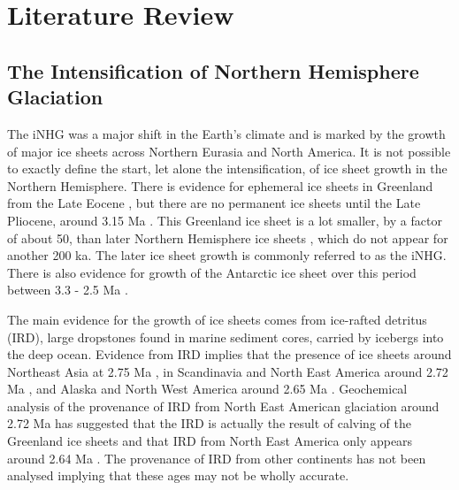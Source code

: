 \section{Literature Review}

\subsection{The Intensification of Northern Hemisphere Glaciation}

The iNHG was a major shift in the Earth’s climate and is marked by the growth of major ice sheets across Northern Eurasia and North America. It is not possible to exactly define the start, let alone the intensification, of ice sheet growth in the Northern Hemisphere. There is evidence for ephemeral ice sheets in Greenland from the Late Eocene \citep{eldrettContinentalIceGreenland2007}, but there are no permanent ice sheets until the Late Pliocene, around 3.15 Ma \citep{bartoliFinalClosurePanama2005}. This Greenland ice sheet is a lot smaller, by a factor of about 50, than later Northern Hemisphere ice sheets \citep{batchelorConfigurationNorthernHemisphere2019}, which do not appear for another 200 ka. The later ice sheet growth is commonly referred to as the iNHG. There is also evidence for growth of the Antarctic ice sheet over this period between 3.3 - 2.5 Ma \citep{mckayAntarcticSouthernOcean2012}.

The main evidence for the growth of ice sheets comes from ice-rafted detritus (IRD), large dropstones found in marine sediment cores, carried by icebergs into the deep ocean. Evidence from IRD implies that the presence of ice sheets around Northeast Asia at 2.75 Ma \citep{maslinInitiationNorthernHemisphere1995}, in Scandinavia and North East America around 2.72 Ma \citep{kleivenIntensificationNorthernHemisphere2002}, and Alaska and North West America around 2.65 Ma \citep{maslinProgressiveIntensificationNorthern1996}. Geochemical analysis of the provenance of IRD from North East American glaciation around 2.72 Ma has suggested that the IRD is actually the result of calving of the Greenland ice sheets and that IRD from North East America only appears around 2.64 Ma \citep{baileyAlternativeSuggestionPliocene2013}. The provenance of IRD from other continents has not been analysed implying that these ages may not be wholly accurate.

